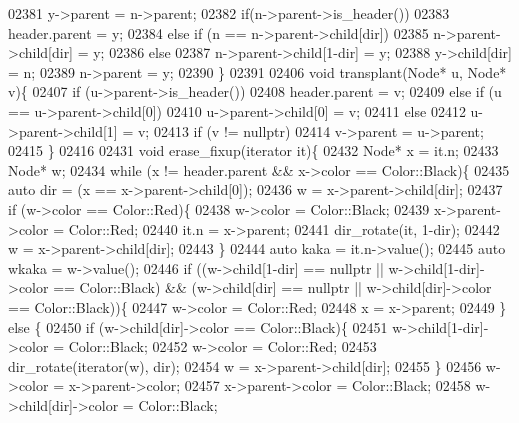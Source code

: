 \begin{DoxyCode}
02381         y->parent = n->parent;
02382         \textcolor{keywordflow}{if}(n->parent->is\_header())
02383             header.parent = y;
02384         \textcolor{keywordflow}{else} if (n == n->parent->child[dir])
02385             n->parent->child[dir] = y;
02386         \textcolor{keywordflow}{else}
02387             n->parent->child[1-dir] = y;
02388         y->child[dir] = n;
02389         n->parent = y;
02390     \}
02391 
02406     \textcolor{keywordtype}{void} transplant(Node* u, Node* v)\{
02407         \textcolor{keywordflow}{if} (u->parent->is\_header())
02408             header.parent = v;
02409         \textcolor{keywordflow}{else} if (u == u->parent->child[0])
02410             u->parent->child[0] = v;
02411         \textcolor{keywordflow}{else}
02412             u->parent->child[1] = v;
02413         \textcolor{keywordflow}{if} (v != \textcolor{keyword}{nullptr})
02414             v->parent = u->parent;
02415     \}
02416 
02431     \textcolor{keywordtype}{void} erase\_fixup(iterator it)\{
02432         Node* x = it.n;
02433         Node* w;
02434         \textcolor{keywordflow}{while} (x != header.parent && x->color == Color::Black)\{
02435             \textcolor{keyword}{auto} dir = (x == x->parent->child[0]);
02436             w = x->parent->child[dir];
02437             \textcolor{keywordflow}{if} (w->color == Color::Red)\{
02438                 w->color = Color::Black;
02439                 x->parent->color = Color::Red;
02440                 it.n = x->parent;
02441                 dir\_rotate(it, 1-dir);
02442                 w = x->parent->child[dir];
02443             \}
02444             \textcolor{keyword}{auto} kaka = it.n->value();
02445             \textcolor{keyword}{auto} wkaka = w->value();
02446             \textcolor{keywordflow}{if} ((w->child[1-dir] == \textcolor{keyword}{nullptr} || w->child[1-dir]->color == 
      Color::Black) && (w->child[dir] == \textcolor{keyword}{nullptr} || w->child[dir]->color == Color::Black))\{
02447                 w->color = Color::Red;
02448                 x = x->parent;
02449             \} \textcolor{keywordflow}{else} \{
02450                 \textcolor{keywordflow}{if} (w->child[dir]->color == Color::Black)\{
02451                     w->child[1-dir]->color = Color::Black;
02452                     w->color = Color::Red;
02453                     dir\_rotate(iterator(w), dir);
02454                     w = x->parent->child[dir];
02455                 \}
02456                 w->color = x->parent->color;
02457                 x->parent->color = Color::Black;
02458                 w->child[dir]->color = Color::Black;

\end{DoxyCode}
